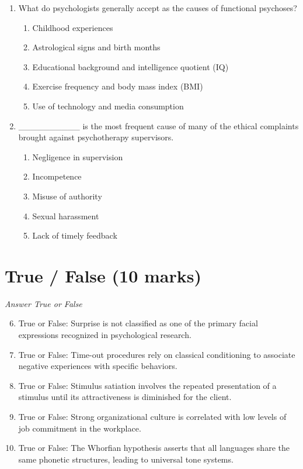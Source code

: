 \documentclass[12pt]{article}
\begin{document}
\begin{enumerate}[label=\arabic*.]
\begin{enumerate}[label=(\alph*)]
    \item Beck's cognitive-behavioral therapy.
    \item Pavlov's classical conditioning theory.
\end{enumerate}
\item What do psychologists generally accept as the causes of functional psychoses?
\begin{enumerate}[label=(\alph*)]
    \item Childhood experiences
    \item Astrological signs and birth months
    \item Educational background and intelligence quotient (IQ)
    \item Exercise frequency and body mass index (BMI)
    \item Use of technology and media consumption
\end{enumerate}
\item \_\_\_\_\_\_\_\_\_\_ is the most frequent cause of many of the ethical complaints brought against psychotherapy supervisors.
\begin{enumerate}[label=(\alph*)]
    \item Negligence in supervision
    \item Incompetence
    \item Misuse of authority
    \item Sexual harassment
    \item Lack of timely feedback
\end{enumerate}
\end{enumerate}

\section*{True / False (10 marks)}
\textit{Answer True or False}
\begin{enumerate}[label=\arabic*.]
\setcounter{enumi}{5}
\item True or False: Surprise is not classified as one of the primary facial expressions recognized in psychological research.
\item True or False: Time-out procedures rely on classical conditioning to associate negative experiences with specific behaviors.
\item True or False: Stimulus satiation involves the repeated presentation of a stimulus until its attractiveness is diminished for the client.
\item True or False: Strong organizational culture is correlated with low levels of job commitment in the workplace.
\item True or False: The Whorfian hypothesis asserts that all languages share the same phonetic structures, leading to universal tone systems.
\end{enumerate}
\end{document}
